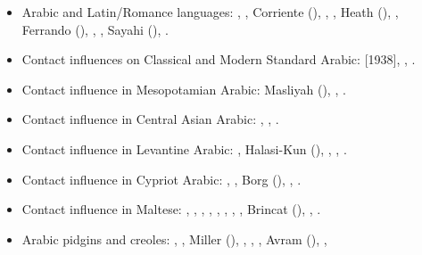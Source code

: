 \documentclass[output=paper]{langsci/langscibook}
\begin{document}
\begin{itemize}[noitemsep,leftmargin=11pt]
\item[\adfhalfrightarrowhead]Arabic and Latin/Romance languages: \citet{Brunot1949}, \citet{Benoliel1977}, Corriente (\citeyear{Corriente1978,Corriente1992chapter,Corriente1992book,Corriente2000,Corriente2005,Corriente2008}), \citet{Talmoudi1986}, \citet{Abdu1988}, Heath (\citeyear{Heath1989,Heath1999,Heath2015}), \citet{Cifoletti1994}, Ferrando (\citeyear{Ferrando1995,Ferrando1997}), \citet{OuldMohamedBaba2003}, \citet{Vicente2006}, Sayahi
(\citeyear{Sayahi2011,Sayahi2014,Sayahi2015}), \citet{Danna2018phonetic}.

\item[\adfhalfrightarrowhead]Contact influences on Classical and Modern Standard Arabic: \citet{Jeffrey2007} [1938], \citet{Blau1969}, \citet{Hebbo1984}.

\item[\adfhalfrightarrowhead]Contact influence in Mesopotamian Arabic: Masliyah (\citeyear{Masliyah1996,Masliyah1997}), \citet{MatrasShabibi2007}, \citet{ElZarkaZiagos2019}.

\item[\adfhalfrightarrowhead]Contact influence in Central Asian Arabic: \citet{Jastrow2005}, \citet{Ratcliffe2005}, \citet{Ingham2011afg}.

\item[\adfhalfrightarrowhead]Contact influence in Levantine Arabic: \citet{Barbot1961}, Halasi-Kun (\citeyear{Halasi-Kun1969,Halasi-Kun1973,Halasi-Kun1982}), \citet{Hopkins1995}, \citet{Contini1999}, \citet{Neishtadt2015}.

\item[\adfhalfrightarrowhead]Contact influence in Cypriot Arabic: \citet{Newton1964}, \citet{Tsiapera1964}, Borg (\citeyear{Borg1985,Borg1997CMA,Borg2004}), \citet{Roth2004}, \citet{Gulle2016}.

\item[\adfhalfrightarrowhead]Contact influence in Maltese: \citet{colin1957}, \citet{Aquilina1958}, \citet{krier1976}, \citet{Drewes1994}, \citet{mifsudloanverbs}, \citet{stolz2003}, \citet{vella2003}, \citet{bovingdondalli2006}, Brincat (\citeyear{brincat1996,brincat2011}), \citet{comriespagnol2016},  \citet{Souag2018berber}.

\item[\adfhalfrightarrowhead]Arabic pidgins and creoles: \citet{Owens1985}, \citet{BurengVincent1986}, Miller (\citeyear{Miller1989,Miller1993}), \citet{Nakao2012}, \citet{Luffin2014}, \citet{Manfredi2014relex}, Avram (\citeyear{Avram2017article,Avram2019}), \citet{Bizri2018}, \citet{Owens2018}


\end{itemize}
\end{document}

